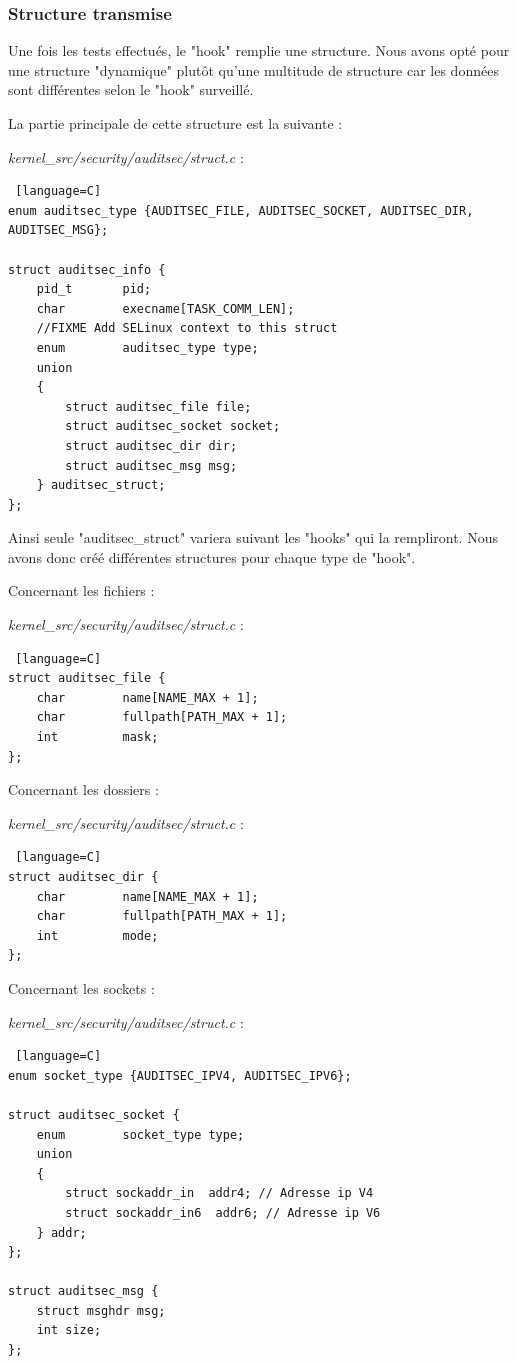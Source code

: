 \documentclass[pdftex,a4paper,titlepage,11pt]{article}
\begin{document}
\subsubsection{Structure transmise}

Une fois les tests effectués, le "hook" remplie une structure. Nous avons opté pour une structure "dynamique" plutôt qu'une multitude de structure car les données sont différentes selon le "hook" surveillé.

La partie principale de cette structure est la suivante :

\textit{{kernel\_src}/security/auditsec/struct.c} :
\begin{lstlisting} [language=C]
enum auditsec_type {AUDITSEC_FILE, AUDITSEC_SOCKET, AUDITSEC_DIR, AUDITSEC_MSG};

struct auditsec_info {
    pid_t       pid;
    char        execname[TASK_COMM_LEN];
    //FIXME Add SELinux context to this struct
    enum        auditsec_type type;
    union
    {  
        struct auditsec_file file;
        struct auditsec_socket socket;
        struct auditsec_dir dir;
        struct auditsec_msg msg;
    } auditsec_struct;
};
\end{lstlisting} 

Ainsi seule "auditsec\_struct" variera suivant les "hooks" qui la rempliront. Nous avons donc créé différentes structures pour chaque type de "hook".

Concernant les fichiers :

\textit{{kernel\_src}/security/auditsec/struct.c} :
\begin{lstlisting} [language=C]
struct auditsec_file {
    char        name[NAME_MAX + 1];
    char        fullpath[PATH_MAX + 1];
    int         mask;
};
\end{lstlisting} 

Concernant les dossiers : 

\textit{{kernel\_src}/security/auditsec/struct.c} :
\begin{lstlisting} [language=C]
struct auditsec_dir {
    char        name[NAME_MAX + 1];
    char        fullpath[PATH_MAX + 1];
    int         mode;
};
\end{lstlisting} 

Concernant les sockets : 

\textit{{kernel\_src}/security/auditsec/struct.c} :
\begin{lstlisting} [language=C]
enum socket_type {AUDITSEC_IPV4, AUDITSEC_IPV6};

struct auditsec_socket {
    enum        socket_type type;
    union
    {
        struct sockaddr_in  addr4; // Adresse ip V4
        struct sockaddr_in6  addr6; // Adresse ip V6
    } addr;
};

struct auditsec_msg {
    struct msghdr msg;
    int size;
};
\end{lstlisting} 
\end{document}
